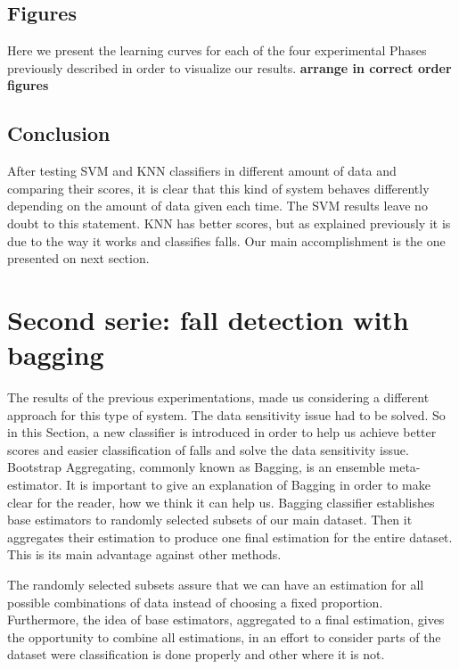 \documentclass[10pt, conference, compsocconf]{IEEEtran}
\begin{document}
\subsection{Figures}

Here we present the learning curves for each of the four experimental Phases previously described in order to visualize our results. 
{\bf arrange in correct order figures}


\subsection{Conclusion}

After testing SVM and KNN classifiers in different amount of data and comparing their scores, it is clear that this kind of system behaves differently depending on the amount of data given each time. The SVM results leave no doubt to this statement. KNN has better scores, but as explained previously it is due to the way it works and classifies falls. Our main accomplishment is the one presented on next section.

\section{Second serie: fall detection with bagging} \label{BaggingFall}
 

The results of the previous experimentations, made us considering a different approach for this type of system. The data sensitivity issue had to be solved. So in this Section, a new classifier is introduced in order to help us achieve better scores and easier classification of falls and solve the data sensitivity issue. Bootstrap Aggregating, commonly known as Bagging, is an ensemble meta-estimator. It is important to give an explanation of Bagging in order to make clear for the reader, how we think it can help us. Bagging classifier establishes base estimators to randomly selected subsets of our main dataset. Then it aggregates their estimation to produce one final estimation for the entire dataset. This is its main advantage against other methods. 

The randomly selected subsets assure that we can have an estimation for all possible combinations of data instead of choosing a fixed proportion. Furthermore, the idea of base estimators, aggregated to a final estimation, gives the opportunity to combine all estimations, in an effort to consider parts of the dataset were classification is done properly and other where it is not. 
\end{document}

